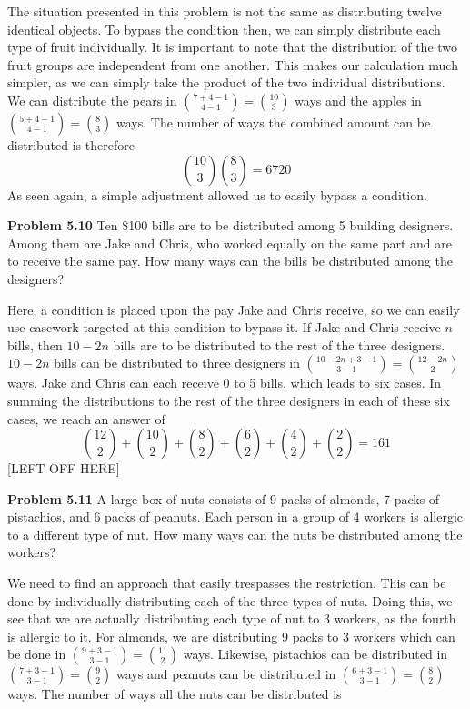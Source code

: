 \documentclass[11pt]{scrartcl}
\begin{document}
 The situation presented in this problem is not the same as distributing twelve identical objects. To bypass the condition then, we can simply distribute each type of fruit individually. It is important to note that the distribution of the two fruit groups are independent from one another. This makes our calculation much simpler, as we can simply take the product of the two individual distributions. We can distribute the pears in ${{7+4-1} \choose {4-1}}={10 \choose 3}$ ways and the apples in ${{5+4-1} \choose {4-1}}={8 \choose 3}$ ways. The number of ways the combined amount can be distributed is therefore 
$${10 \choose 3}{8 \choose 3}=6720$$
\noindent 
As seen again, a simple adjustment allowed us to easily bypass a condition. \\
\begin{tcolorbox}
\textbf{Problem 5.10} Ten \$100 bills are to be distributed among 5 building designers. Among them are Jake and Chris, who worked equally on the same part and are to receive the same pay. How many ways can the bills be distributed among the designers?
\end{tcolorbox}
 Here, a condition is placed upon the pay Jake and Chris receive, so we can easily use casework targeted at this condition to bypass it. If Jake and Chris receive $n$ bills, then $10-2n$ bills are to be distributed to the rest of the three designers. $10-2n$ bills can be distributed to three designers in ${{10-2n+3-1} \choose {3-1}}={{12-2n} \choose 2}$ ways. Jake and Chris can each receive 0 to 5 bills, which leads to six cases. In summing the distributions to the rest of the three designers in each of these six cases, we reach an answer of 
$${12 \choose 2}+{10 \choose 2}+{8 \choose 2}+{6 \choose 2}+{4 \choose 2}+{2 \choose 2}={161}$$
[LEFT OFF HERE]
\begin{tcolorbox}
\textbf{Problem 5.11} A large box of nuts consists of 9 packs of almonds, 7 packs of pistachios, and 6 packs of peanuts. Each person in a group of 4 workers is allergic to a different type of nut. How many ways can the nuts be distributed among the workers?
\end{tcolorbox}
\noindent
We need to find an approach that easily trespasses the restriction. This can be done by individually distributing each of the three types of nuts. Doing this, we see that we are actually distributing each type of nut to 3 workers, as the fourth is allergic to it. For almonds, we are distributing 9 packs to 3 workers which can be done in ${{9+3-1} \choose {3-1}}={11 \choose 2}$ ways. Likewise, pistachios can be distributed in ${{7+3-1} \choose {3-1}}={9 \choose 2}$ ways and peanuts can be distributed in ${{6+3-1} \choose {3-1}}={8 \choose 2}$ ways. The number of ways all the nuts can be distributed is 
\end{document}
